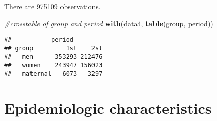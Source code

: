\documentclass[
]{article}
\newenvironment{Shaded}{\begin{snugshade}}{\end{snugshade}}
\newcommand{\CommentTok}[1]{\textcolor[rgb]{0.56,0.35,0.01}{\textit{#1}}}
\newcommand{\DataTypeTok}[1]{\textcolor[rgb]{0.13,0.29,0.53}{#1}}
\newcommand{\KeywordTok}[1]{\textcolor[rgb]{0.13,0.29,0.53}{\textbf{#1}}}
\newcommand{\NormalTok}[1]{#1}
\newcommand{\OperatorTok}[1]{\textcolor[rgb]{0.81,0.36,0.00}{\textbf{#1}}}
\newcommand{\StringTok}[1]{\textcolor[rgb]{0.31,0.60,0.02}{#1}}
\begin{document}
There are 975109 observations.

\begin{Shaded}
\end{Shaded}

\begin{Shaded}
\begin{Highlighting}[]
\CommentTok{#crosstable of group and period}
\KeywordTok{with}\NormalTok{(data4, }\KeywordTok{table}\NormalTok{(group, period))}
\end{Highlighting}
\end{Shaded}

\begin{verbatim}
##           period
## group         1st    2st
##   men      353293 212476
##   women    243947 156023
##   maternal   6073   3297
\end{verbatim}

\hypertarget{epidemiologic-characteristics}{%
\section{Epidemiologic
characteristics}\label{epidemiologic-characteristics}}
\end{document}
